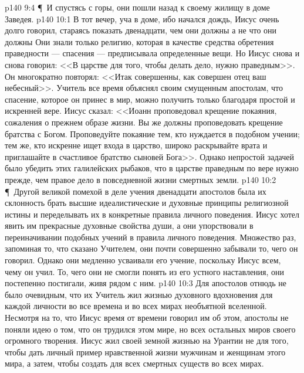 \vs p140 9:4 \P\ И спустясь с горы, они пошли назад к своему жилищу в доме Заведея.
\vs p140 10:1 В тот вечер, уча в доме, ибо начался дождь, Иисус очень долго говорил, стараясь показать двенадцати, чем они должны  а не что они должны  Они знали только религию, которая в качестве средства обретения праведности --- спасения --- предписывала  определенные вещи. Но Иисус снова и снова говорил: <<В царстве для того, чтобы делать дело, нужно  праведным>>. Он многократно повторял: <<Итак  совершенны, как совершен отец ваш небесный>>. Учитель все время объяснял своим смущенным апостолам, что спасение, которое он принес в мир, можно получить только  благодаря простой и искренней вере. Иисус сказал: <<Иоанн проповедовал крещение покаяния, сожаления о прежнем образе жизни. Вы же должны проповедовать крещение братства с Богом. Проповедуйте покаяние тем, кто нуждается в подобном учении; тем же, кто искренне ищет входа в царство, широко раскрывайте врата и приглашайте в счастливое братство сыновей Бога>>. Однако непростой задачей было убедить этих галилейских рыбаков, что в царстве  праведным по вере нужно прежде, чем  правое дело в повседневной жизни смертных земли.
\vs p140 10:2 \P\ Другой великой помехой в деле учения двенадцати апостолов была их склонность брать высшие идеалистические и духовные принципы религиозной истины и переделывать их в конкретные правила личного поведения. Иисус хотел явить им прекрасные духовные свойства души, а они упорствовали в переиначивании подобных учений в правила личного поведения. Множество раз, запоминая то, что сказано Учителем, они почти совершенно забывали то, чего он  говорил. Однако они медленно усваивали его учение, поскольку Иисус  всем, чему он учил. То, чего они не смогли понять из его устного наставления, они постепенно постигали, живя рядом с ним.
\vs p140 10:3 Для апостолов отнюдь не было очевидным, что их Учитель жил жизнью духовного вдохновения для каждой личности во все времена и во всех мирах необъятной вселенной. Несмотря на то, что Иисус время от времени говорил им об этом, апостолы не поняли идею о том, что он трудился  этом мире, но  всех остальных миров своего огромного творения. Иисус жил своей земной жизнью на Урантии не для того, чтобы дать личный пример нравственной жизни мужчинам и женщинам этого мира, а затем, чтобы создать  для всех смертных существ во всех мирах.
